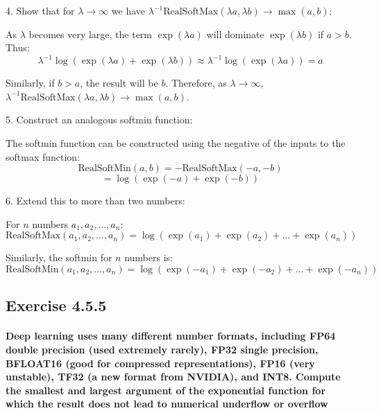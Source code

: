4. Show that for \( \lambda \to \infty \) we have \( \lambda^{-1} \textrm{RealSoftMax}(\lambda a, \lambda b) \to \max(a, b) \):

As \( \lambda \) becomes very large, the term \( \exp(\lambda a) \) will dominate \( \exp(\lambda b) \) if \( a > b \). Thus:
\[ \lambda^{-1} \log(\exp(\lambda a) + \exp(\lambda b)) \approx \lambda^{-1} \log(\exp(\lambda a)) = a \]

Similarly, if \( b > a \), the result will be \( b \).
Therefore, as \( \lambda \to \infty \), \( \lambda^{-1} \textrm{RealSoftMax}(\lambda a, \lambda b) \to \max(a, b) \).

5. Construct an analogous softmin function:

The softmin function can be constructed using the negative of the inputs to the softmax function:
\[ \textrm{RealSoftMin}(a, b) = -\textrm{RealSoftMax}(-a, -b) \]
\[ = \log(\exp(-a) + \exp(-b)) \]

6. Extend this to more than two numbers:

For \( n \) numbers \( a_1, a_2, \ldots, a_n \):
\[ \textrm{RealSoftMax}(a_1, a_2, \ldots, a_n) = \log(\exp(a_1) + \exp(a_2) + \ldots + \exp(a_n)) \]

Similarly, the softmin for \( n \) numbers is:
\[ \textrm{RealSoftMin}(a_1, a_2, \ldots, a_n) = \log(\exp(-a_1) + \exp(-a_2) + \ldots + \exp(-a_n)) \]

\subsection{Exercise 4.5.5}

\paragraph{Deep learning uses many different number formats, including FP64 double precision (used extremely rarely), FP32 single precision, BFLOAT16 (good for compressed representations), FP16 (very unstable), TF32 (a new format from NVIDIA), and INT8. Compute the smallest and largest argument of the exponential function for which the result does not lead to numerical underflow or overflow}


